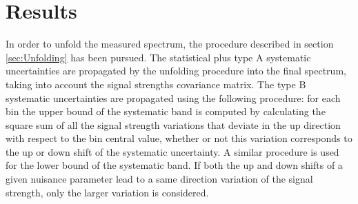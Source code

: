 \section{Results}
\label{sec:Results}

In order to unfold the measured spectrum, the procedure described in section \ref{sec:Unfolding} has been pursued.
The statistical plus type A systematic uncertainties are propagated by the unfolding procedure into the final spectrum, taking into account the signal strengths covariance matrix. The type B systematic uncertainties are propagated using the following procedure: for each \pth bin the upper bound of the systematic band is computed by calculating the square sum of all the signal strength variations that deviate in the up direction with respect to the bin central value, whether or not this variation corresponds to the up or down shift of the systematic uncertainty. A similar procedure is used for the lower bound of the systematic band. If both the up and down shifts of a given nuisance parameter lead to a same direction variation of the signal strength, only the larger variation is considered.

